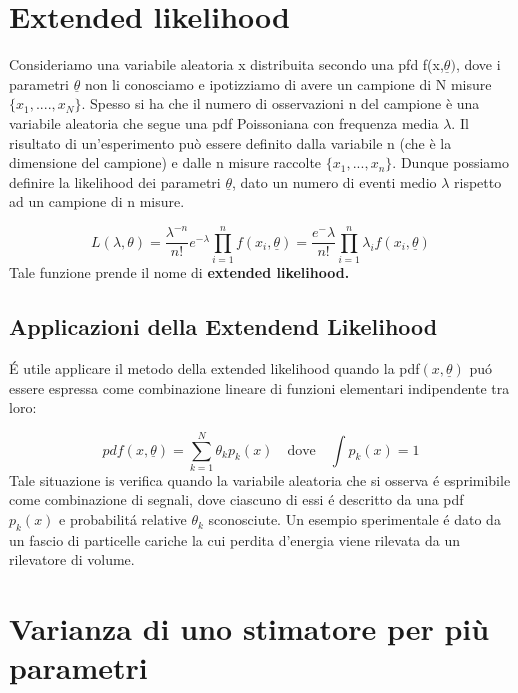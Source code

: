 \section{Extended likelihood}

Consideriamo una variabile aleatoria x distribuita secondo una pfd f(x,$\underline{\theta})$, dove i parametri $\underline{\theta}$ non li conosciamo e ipotizziamo di avere un campione di N misure $\{x_1,....,x_N\}$. Spesso si ha che il numero di osservazioni n del campione \`{e} una variabile aleatoria che segue una pdf Poissoniana con frequenza media $\lambda$. Il risultato di un'esperimento pu\`{o} essere definito dalla variabile n (che \`{e} la dimensione del campione) e dalle n misure raccolte $\{x_1,...,x_n\}.$ \newline
Dunque possiamo definire la likelihood dei parametri $\underline{\theta}$, dato un numero di eventi medio $\lambda$ rispetto ad un campione di n misure.

\begin{equation}
	L(\lambda,\theta) = \dfrac{\lambda^{-n}}{n!}e^{-\lambda} \prod_{i=1}^nf(x_i,\underline{\theta}) = \dfrac{e^-{\lambda}}{n!} \prod_{i=1}^{n} \lambda_{i}f(x_i,\underline{\theta})
\end{equation}
Tale funzione prende il nome di \textbf{extended likelihood.}

\subsection{Applicazioni della Extendend Likelihood}
\'{E} utile applicare il metodo della extended likelihood quando la pdf$(x,\underline{\theta})$ pu\'{o} essere espressa come combinazione lineare di funzioni elementari indipendente tra loro:

\begin{equation*}
	pdf(x, \underline{\theta}) = \sum_{k=1}^N\theta_kp_k(x) \quad \text{dove} \quad \int p_k(x) = 1
\end{equation*}
Tale situazione is verifica quando la variabile aleatoria che si osserva \'{e} esprimibile come combinazione di segnali, dove ciascuno di essi \'{e} descritto da una pdf $p_k(x)$ e probabilit\'{a} relative $\theta_k$ sconosciute. \newline
Un esempio sperimentale \'{e} dato da un fascio di particelle cariche la cui perdita d'energia viene rilevata da un rilevatore di volume. 
\section{Varianza di uno stimatore per pi\`{u} parametri}

